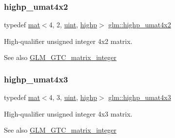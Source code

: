 \subsubsection{\texorpdfstring{highp\+\_\+umat4x2}{highp\_umat4x2}}
{\footnotesize\ttfamily typedef \hyperlink{structglm_1_1mat}{mat}$<$4, 2, \hyperlink{group__core__precision_ga4fd29415871152bfb5abd588334147c8}{uint}, \hyperlink{namespaceglm_a36ed105b07c7746804d7fdc7cc90ff25ac6f7eab42eacbb10d59a58e95e362074}{highp}$>$ \hyperlink{group__gtc__matrix__integer_gaf56fa20818ea9c18fd0a4a8bf141a738}{glm\+::highp\+\_\+umat4x2}}

High-\/qualifier unsigned integer 4x2 matrix. \begin{DoxySeeAlso}{See also}
\hyperlink{group__gtc__matrix__integer}{G\+L\+M\+\_\+\+G\+T\+C\+\_\+matrix\+\_\+integer} 
\end{DoxySeeAlso}
\mbox{\label{group__gtc__matrix__integer_gaf89b61119da7856a0867a43d6c25913a}} 
\subsubsection{\texorpdfstring{highp\+\_\+umat4x3}{highp\_umat4x3}}
{\footnotesize\ttfamily typedef \hyperlink{structglm_1_1mat}{mat}$<$4, 3, \hyperlink{group__core__precision_ga4fd29415871152bfb5abd588334147c8}{uint}, \hyperlink{namespaceglm_a36ed105b07c7746804d7fdc7cc90ff25ac6f7eab42eacbb10d59a58e95e362074}{highp}$>$ \hyperlink{group__gtc__matrix__integer_gaf89b61119da7856a0867a43d6c25913a}{glm\+::highp\+\_\+umat4x3}}

High-\/qualifier unsigned integer 4x3 matrix. \begin{DoxySeeAlso}{See also}
\hyperlink{group__gtc__matrix__integer}{G\+L\+M\+\_\+\+G\+T\+C\+\_\+matrix\+\_\+integer} 
\end{DoxySeeAlso}
\mbox{\label{group__gtc__matrix__integer_gada50011594ccf358c9eafe49ff07999f}} 
